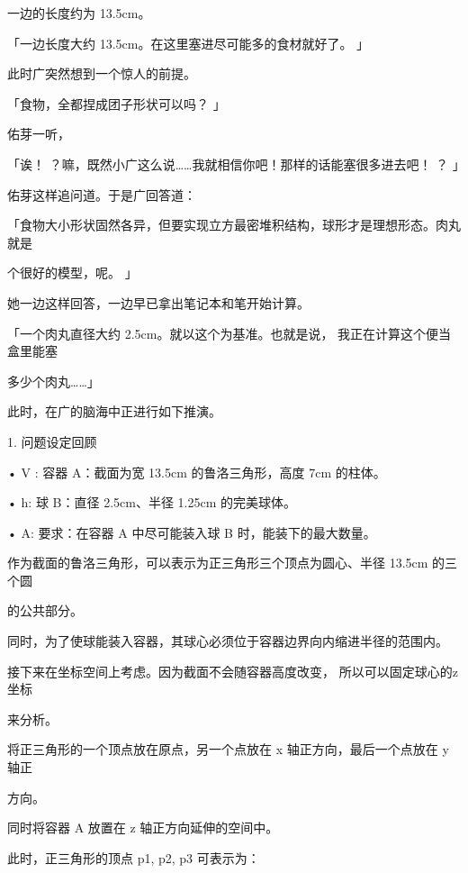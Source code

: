 一边的长度约为 13.5cm。\par
「一边长度大约 13.5cm。在这里塞进尽可能多的食材就好了。 」\par
此时广突然想到一个惊人的前提。\par
「食物，全都捏成团子形状可以吗？ 」\par
佑芽一听，\par
「诶！ ？嘛，既然小广这么说……我就相信你吧！那样的话能塞很多进去吧！ ？ 」\par
佑芽这样追问道。于是广回答道：\par
「食物大小形状固然各异，但要实现立方最密堆积结构，球形才是理想形态。肉丸就是\par
个很好的模型，呢。 」\par
她一边这样回答，一边早已拿出笔记本和笔开始计算。\par
「一个肉丸直径大约 2.5cm。就以这个为基准。也就是说， 我正在计算这个便当盒里能塞\par
多少个肉丸……」\par
此时，在广的脑海中正进行如下推演。\par
1. 问题设定回顾\par
• V : 容器 A：截面为宽 13.5cm 的鲁洛三角形，高度 7cm 的柱体。\par
• h: 球 B：直径 2.5cm、半径 1.25cm 的完美球体。\par
• A: 要求：在容器 A 中尽可能装入球 B 时，能装下的最大数量。\par
作为截面的鲁洛三角形，可以表示为正三角形三个顶点为圆心、半径 13.5cm 的三个圆\par
的公共部分。\par
同时，为了使球能装入容器，其球心必须位于容器边界向内缩进半径的范围内。\par
接下来在坐标空间上考虑。因为截面不会随容器高度改变， 所以可以固定球心的z 坐标\par
来分析。\par
将正三角形的一个顶点放在原点，另一个点放在 x 轴正方向，最后一个点放在 y 轴正\par
方向。\par
同时将容器 A 放置在 z 轴正方向延伸的空间中。\par
此时，正三角形的顶点 p1, p2, p3 可表示为：\par

